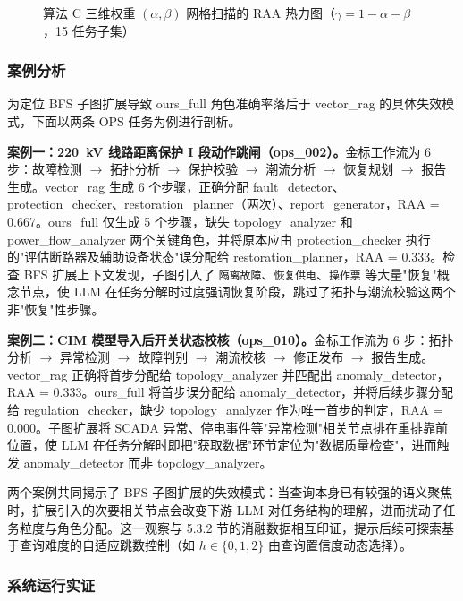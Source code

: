 \begin{figure}[htbp]
\centering

\caption{算法 C 三维权重 $(\alpha, \beta)$ 网格扫描的 RAA 热力图（$\gamma = 1 - \alpha - \beta$，15 任务子集）}
\label{fig:weight_sweep}
\end{figure}

\subsubsection{案例分析}

为定位 BFS 子图扩展导致 ours\_full 角色准确率落后于 vector\_rag 的具体失效模式，下面以两条 OPS 任务为例进行剖析。

\textbf{案例一：220~kV 线路距离保护 I 段动作跳闸（ops\_002）。}金标工作流为 6 步：故障检测 $\rightarrow$ 拓扑分析 $\rightarrow$ 保护校验 $\rightarrow$ 潮流分析 $\rightarrow$ 恢复规划 $\rightarrow$ 报告生成。vector\_rag 生成 6 个步骤，正确分配 fault\_detector、protection\_checker、restoration\_planner（两次）、report\_generator，RAA = 0.667。ours\_full 仅生成 5 个步骤，缺失 topology\_analyzer 和 power\_flow\_analyzer 两个关键角色，并将原本应由 protection\_checker 执行的"评估断路器及辅助设备状态"误分配给 restoration\_planner，RAA = 0.333。检查 BFS 扩展上下文发现，子图引入了 \texttt{隔离故障}、\texttt{恢复供电}、\texttt{操作票} 等大量"恢复"概念节点，使 LLM 在任务分解时过度强调恢复阶段，跳过了拓扑与潮流校验这两个非"恢复"性步骤。

\textbf{案例二：CIM 模型导入后开关状态校核（ops\_010）。}金标工作流为 6 步：拓扑分析 $\rightarrow$ 异常检测 $\rightarrow$ 故障判别 $\rightarrow$ 潮流校核 $\rightarrow$ 修正发布 $\rightarrow$ 报告生成。vector\_rag 正确将首步分配给 topology\_analyzer 并匹配出 anomaly\_detector，RAA = 0.333。ours\_full 将首步误分配给 anomaly\_detector，并将后续步骤分配给 regulation\_checker，缺少 topology\_analyzer 作为唯一首步的判定，RAA = 0.000。子图扩展将 SCADA 异常、停电事件等"异常检测"相关节点排在重排靠前位置，使 LLM 在任务分解时即把"获取数据"环节定位为"数据质量检查"，进而触发 anomaly\_detector 而非 topology\_analyzer。

两个案例共同揭示了 BFS 子图扩展的失效模式：当查询本身已有较强的语义聚焦时，扩展引入的次要相关节点会改变下游 LLM 对任务结构的理解，进而扰动子任务粒度与角色分配。这一观察与 5.3.2 节的消融数据相互印证，提示后续可探索基于查询难度的自适应跳数控制（如 $h\in\{0, 1, 2\}$ 由查询置信度动态选择）。

\subsubsection{系统运行实证}

